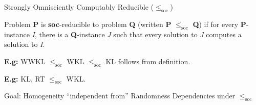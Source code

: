 \begin{frame}{Strongly Omnisciently Computably Reducible
($\leq_{\text{soc}}$)}
  \begin{define*}
    Problem \textbf{P} is \textbf{soc}-reducible to problem \textbf{Q}
    (written \textbf{P} $\leq_{\text{soc}}$ \textbf{Q}) if for every
    \textbf{P}-instance \textit{I}, there is a \textbf{Q}-instance
    \textit{J} such that every solution to \textit{J} computes a solution
    to \textit{I}.
  \end{define*}

  \vspace{2em}
  \textbf{E.g:} WWKL $\leq_{\text{soc}}$ WKL $\leq_{\text{soc}}$ KL follows
  from definition.

  \vspace{2em}
  \textbf{E.g:} KL, RT $\leq_{\text{soc}}$ WKL.
\end{frame}

\begin{frame}{Goal: Homogeneity ``independent from'' Randomness}
  Dependencies under $\leq_{\text{soc}}$

  \vspace{2em}
  \begin{center}
  \end{center}
\end{frame}
